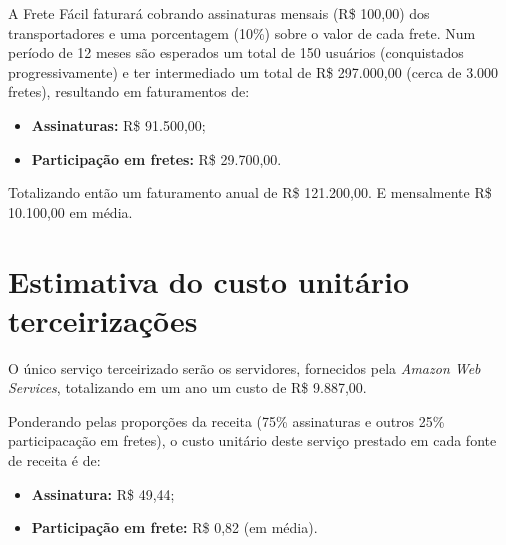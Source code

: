 A Frete Fácil faturará cobrando assinaturas mensais (R\$ 100,00) dos transportadores e uma porcentagem (10\%) sobre o valor de cada frete. Num período de 12 meses são esperados um total de 150 usuários (conquistados progressivamente) e ter intermediado um total de R\$ 297.000,00 (cerca de 3.000 fretes), resultando em faturamentos de:

\begin{itemize}
  \item \textbf{Assinaturas:} R\$ 91.500,00;
  \item \textbf{Participação em fretes:} R\$ 29.700,00.
\end{itemize}

Totalizando então um faturamento anual de R\$ 121.200,00. E mensalmente R\$ 10.100,00 em média.

\section{Estimativa do custo unitário terceirizações}

O único serviço terceirizado serão os servidores, fornecidos pela \textit{Amazon Web Services}, totalizando em um ano um custo de R\$ 9.887,00.

Ponderando pelas proporções da receita (75\% assinaturas e outros 25\% participacação em fretes), o custo unitário deste serviço prestado em cada fonte de receita é de:

\begin{itemize}
  \item \textbf{Assinatura:} R\$ 49,44;
  \item \textbf{Participação em frete:} R\$ 0,82 (em média).
\end{itemize}
